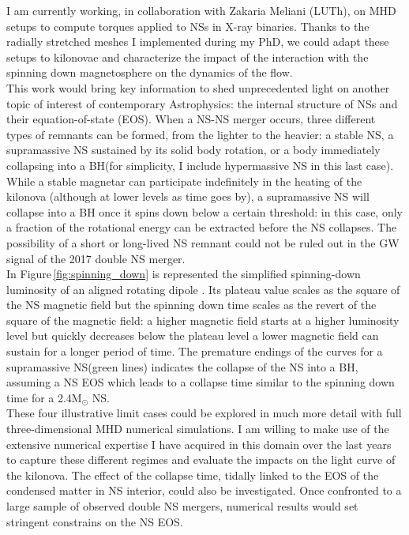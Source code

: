 \documentclass[11pt,onecolumn]{article}
\makeatletter
\newcommand{\gw}{GW\xspace}
\newcommand{\eos}{EOS\xspace}
\newcommand{\mhd}{MHD\xspace}
\newcommand*{\ns}{NS\@\xspace}
\newcommand*{\nss}{NSs\@\xspace}
\newcommand*{\bh}{BH\@\xspace}
\makeatother
\begin{document}
I am currently working, in collaboration with Zakaria Meliani (LUTh), on \mhd setups to compute torques applied to \nss in X-ray binaries. Thanks to the radially stretched meshes I implemented during my PhD, we could adapt these setups to kilonovae and characterize the impact of the interaction with the spinning down magnetosphere on the dynamics of the flow. \\

This work would bring key information to shed unprecedented light on another topic of interest of contemporary Astrophysics: the internal structure of \nss and their equation-of-state (\eos). When a \ns-\ns merger occurs, three different types of remnants can be formed, from the lighter to the heavier: a stable \ns, a supramassive \ns sustained by its solid body rotation, or a body immediately collapsing into a \bh (for simplicity, I include hypermassive \ns in this last case). While a stable magnetar can participate indefinitely in the heating of the kilonova (although at lower levels as time goes by), a supramassive \ns will collapse into a \bh once it spins down below a certain threshold: in this case, only a fraction of the rotational energy can be extracted before the \ns collapses. The possibility of a short or long-lived \ns remnant could not be ruled out in the \gw signal of the 2017 double \ns merger.\\

In Figure\,\ref{fig:spinning_down} is represented the simplified spinning-down luminosity of an aligned rotating dipole \citep{Spitkovsky2006,Philippov2014}. Its plateau value scales as the square of the \ns magnetic field but the spinning down time scales as the revert of the square of the magnetic field: a higher magnetic field starts at a higher luminosity level but quickly decreases below the plateau level a lower magnetic field can sustain for a longer period of time. The premature endings of the curves for a supramassive \ns (green lines) indicates the collapse of the \ns into a \bh, assuming a \ns \eos which leads to a collapse time similar to the spinning down time for a 2.4M$_{\odot}$ \ns \citep[based on][]{Metzger2015}.\\

These four illustrative limit cases could be explored in much more detail with full three-dimensional \mhd numerical simulations. I am willing to make use of the extensive numerical expertise I have acquired in this domain over the last years to capture these different regimes and evaluate the impacts on the light curve of the kilonova. The effect of the collapse time, tidally linked to the \eos of the condensed matter in \ns interior, could also be investigated. Once confronted to a large sample of observed double \ns mergers, numerical results would set stringent constrains on the \ns \eos.\\
\end{document}

